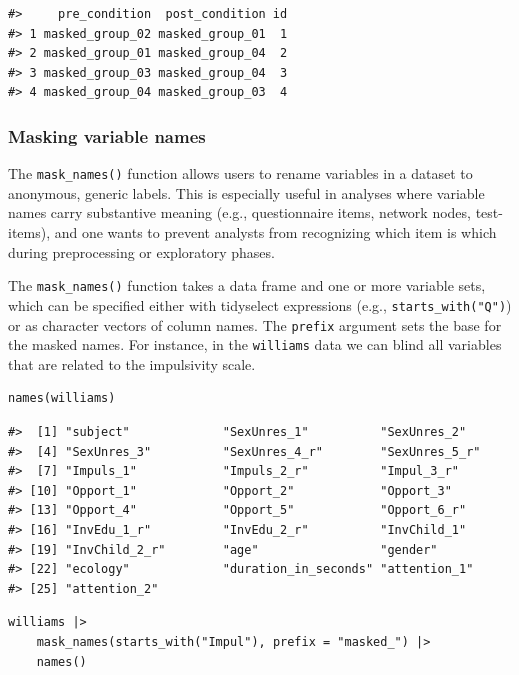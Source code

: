 \begin{verbatim}
#>     pre_condition  post_condition id
#> 1 masked_group_02 masked_group_01  1
#> 2 masked_group_01 masked_group_04  2
#> 3 masked_group_03 masked_group_04  3
#> 4 masked_group_04 masked_group_03  4
\end{verbatim}

\subsubsection{Masking variable names}\label{masking-variable-names}

The \texttt{mask\_names()} function allows users to rename variables in a dataset to anonymous, generic labels. This is especially useful in analyses where variable names carry substantive meaning (e.g., questionnaire items, network nodes, test-items), and one wants to prevent analysts from recognizing which item is which during preprocessing or exploratory phases.

The \texttt{mask\_names()} function takes a data frame and one or more variable sets, which can be specified either with tidyselect expressions (e.g., \texttt{starts\_with("Q")}) or as character vectors of column names. The \texttt{prefix} argument sets the base for the masked names. For instance, in the \texttt{williams} data we can blind all variables that are related to the impulsivity scale.

\begin{verbatim}
names(williams)
\end{verbatim}

\begin{verbatim}
#>  [1] "subject"             "SexUnres_1"          "SexUnres_2"         
#>  [4] "SexUnres_3"          "SexUnres_4_r"        "SexUnres_5_r"       
#>  [7] "Impuls_1"            "Impuls_2_r"          "Impul_3_r"          
#> [10] "Opport_1"            "Opport_2"            "Opport_3"           
#> [13] "Opport_4"            "Opport_5"            "Opport_6_r"         
#> [16] "InvEdu_1_r"          "InvEdu_2_r"          "InvChild_1"         
#> [19] "InvChild_2_r"        "age"                 "gender"             
#> [22] "ecology"             "duration_in_seconds" "attention_1"        
#> [25] "attention_2"
\end{verbatim}

\begin{verbatim}
williams |> 
    mask_names(starts_with("Impul"), prefix = "masked_") |> 
    names()
\end{verbatim}

